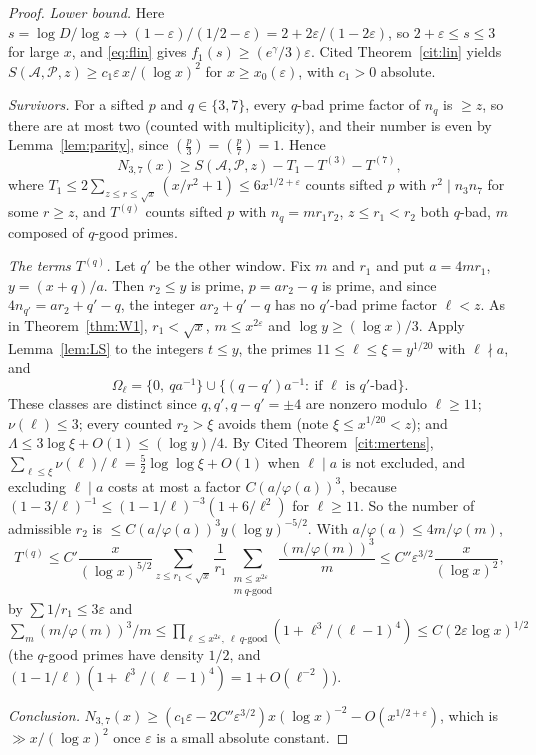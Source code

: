 \documentclass[11pt,reqno]{amsart}
\theoremstyle{definition}
\newcommand{\leg}[2]{\left(\frac{#1}{#2}\right)}
\begin{document}
\begin{proof}
\emph{Lower bound.}  Here $s=\log D/\log z\to(1-\varepsilon)/(1/2-\varepsilon)=2+2\varepsilon/(1-2\varepsilon)$,
so $2+\varepsilon\le s\le3$ for large $x$, and \eqref{eq:flin} gives
$f_1(s)\ge(e^\gamma/3)\varepsilon$.  Cited Theorem~\ref{cit:lin} yields
$S(\mathcal A,\mathcal P,z)\ge c_1\varepsilon\,x/(\log x)^2$ for
$x\ge x_0(\varepsilon)$, with $c_1>0$ absolute.

\emph{Survivors.}  For a sifted $p$ and $q\in\{3,7\}$, every $q$-bad prime
factor of $n_q$ is $\ge z$, so there are at most two (counted with
multiplicity), and their number is even by Lemma~\ref{lem:parity}, since
$\leg p3=\leg p7=1$.  Hence
\[
 N_{3,7}(x)\ge S(\mathcal A,\mathcal P,z)-T_1-T^{(3)}-T^{(7)},
\]
where $T_1\le2\sum_{z\le r\le\sqrt x}(x/r^2+1)\le6x^{1/2+\varepsilon}$ counts sifted $p$
with $r^2\mid n_3n_7$ for some $r\ge z$, and $T^{(q)}$ counts sifted $p$ with
$n_q=mr_1r_2$, $z\le r_1<r_2$ both $q$-bad, $m$ composed of $q$-good primes.

\emph{The terms $T^{(q)}$.}  Let $q'$ be the other window.  Fix $m$ and
$r_1$ and put $a=4mr_1$, $y=(x+q)/a$.  Then $r_2\le y$ is prime, $p=ar_2-q$
is prime, and since $4n_{q'}=ar_2+q'-q$, the integer $ar_2+q'-q$ has no
$q'$-bad prime factor $\ell<z$.  As in Theorem~\ref{thm:W1}, $r_1<\sqrt x$,
$m\le x^{2\varepsilon}$ and $\log y\ge(\log x)/3$.  Apply
Lemma~\ref{lem:LS} to the integers $t\le y$, the primes
$11\le\ell\le\xi=y^{1/20}$ with $\ell\nmid a$, and
\[
 \Omega_\ell=\{0,\ qa^{-1}\}\cup\{(q-q')a^{-1}:\ \text{if $\ell$ is $q'$-bad}\}.
\]
These classes are distinct since $q,q',q-q'=\pm4$ are nonzero modulo
$\ell\ge11$; $\nu(\ell)\le3$; every counted $r_2>\xi$ avoids them (note
$\xi\le x^{1/20}<z$); and $\Lambda\le3\log\xi+O(1)\le(\log y)/4$.  By
Cited Theorem~\ref{cit:mertens}, $\sum_{\ell\le\xi}\nu(\ell)/\ell=\frac52\log\log\xi+O(1)$
when $\ell\mid a$ is not excluded, and excluding $\ell\mid a$ costs at most
a factor $C(a/\varphi(a))^3$, because
$(1-3/\ell)^{-1}\le(1-1/\ell)^{-3}(1+6/\ell^2)$ for $\ell\ge11$.  So the number
of admissible $r_2$ is $\le C(a/\varphi(a))^3y(\log y)^{-5/2}$.  With
$a/\varphi(a)\le4m/\varphi(m)$,
\[
 T^{(q)}\le C'\frac x{(\log x)^{5/2}}\sum_{z\le r_1<\sqrt x}\frac1{r_1}
 \sum_{\substack{m\le x^{2\varepsilon}\\ m\ q\text{-good}}}\frac{(m/\varphi(m))^3}m
 \le C''\varepsilon^{3/2}\frac x{(\log x)^2},
\]
by $\sum1/r_1\le3\varepsilon$ and
$\sum_m(m/\varphi(m))^3/m\le\prod_{\ell\le x^{2\varepsilon},\ \ell\ q\text{-good}}(1+\ell^3/(\ell-1)^4)\le C(2\varepsilon\log x)^{1/2}$
(the $q$-good primes have density $1/2$, and
$(1-1/\ell)(1+\ell^3/(\ell-1)^4)=1+O(\ell^{-2})$).

\emph{Conclusion.}  $N_{3,7}(x)\ge(c_1\varepsilon-2C''\varepsilon^{3/2})x(\log x)^{-2}-O(x^{1/2+\varepsilon})$,
which is $\gg x/(\log x)^2$ once $\varepsilon$ is a small absolute constant.
\end{proof}
\end{document}
